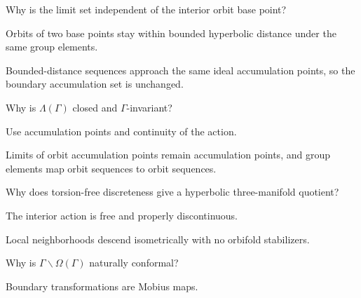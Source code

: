 \begin{exercise}\label{exr:vii37-ped-06}
Why is the limit set independent of the interior orbit base point?
\end{exercise}

\begin{hint}
Orbits of two base points stay within bounded hyperbolic distance under the same group elements.
\end{hint}

\begin{solution}
Bounded-distance sequences approach the same ideal accumulation points, so the boundary accumulation set is unchanged.
\end{solution}

\begin{exercise}\label{exr:vii37-ped-07}
Why is \(\Lambda(\Gamma)\) closed and \(\Gamma\)-invariant?
\end{exercise}

\begin{hint}
Use accumulation points and continuity of the action.
\end{hint}

\begin{solution}
Limits of orbit accumulation points remain accumulation points, and group elements map orbit sequences to orbit sequences.
\end{solution}

\begin{exercise}\label{exr:vii37-ped-08}
Why does torsion-free discreteness give a hyperbolic three-manifold quotient?
\end{exercise}

\begin{hint}
The interior action is free and properly discontinuous.
\end{hint}

\begin{solution}
Local neighborhoods descend isometrically with no orbifold stabilizers.
\end{solution}

\begin{exercise}\label{exr:vii37-ped-09}
Why is \(\Gamma\backslash\Omega(\Gamma)\) naturally conformal?
\end{exercise}

\begin{hint}
Boundary transformations are Mobius maps.
\end{hint}


